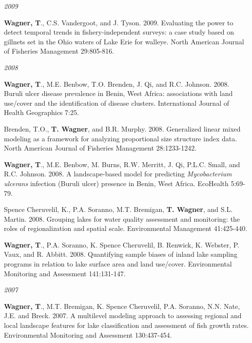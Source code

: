\documentclass[10pt]{article}
\begin{document}
\begin{flushleft}
\begin{etaremune}[start=18]
\end{etaremune}
\emph{2009}
\begin{etaremune}[start=15]
\item {\bf Wagner, T}., C.S. Vandergoot, and J. Tyson. 2009. Evaluating the power to detect temporal trends in fishery-independent surveys: a case study based on gillnets set in the Ohio waters of Lake Erie for walleye. North American Journal of Fisheries Management 29:805-816.

\end{etaremune}
\emph{2008}
\begin{etaremune}[start=14]
\item {\bf Wagner, T}., M.E. Benbow, T.O. Brenden, J. Qi, and R.C. Johnson. 2008. Buruli ulcer disease prevalence in Benin, West Africa: associations with land use/cover and the identification of disease clusters. International Journal of Health Geographics 7:25.

\item Brenden, T.O., {\bf T. Wagner}, and B.R. Murphy. 2008. Generalized linear mixed modeling as a framework for analyzing proportional size structure index data. North American Journal of Fisheries Management 28:1233-1242.

\item {\bf Wagner, T}., M.E. Benbow, M. Burns, R.W. Merritt, J. Qi, P.L.C. Small, and R.C. Johnson. 2008. A landscape-based model for predicting \emph{Mycobacterium ulcerans} infection (Buruli ulcer) presence in Benin, West Africa. EcoHealth 5:69-79.

\item Spence Cheruvelil, K., P.A. Soranno, M.T. Bremigan, {\bf T. Wagner}, and S.L. Martin. 2008. Grouping lakes for water quality assessment and monitoring: the roles of regionalization and spatial scale. Environmental Management 41:425-440. 

\item {\bf Wagner, T}., P.A. Soranno, K. Spence Cheruvelil, B. Renwick, K. Webster, P. Vaux, and R. Abbitt. 2008. Quantifying sample biases of inland lake sampling programs in relation to lake surface area and land use/cover. Environmental Monitoring and Assessment 141:131-147.

\end{etaremune}
\emph{2007}
\begin{etaremune}[start=9]
\item {\bf Wagner, T}., M.T. Bremigan, K. Spence Cheruvelil, P.A. Soranno, N.N. Nate, J.E. and Breck. 2007. A multilevel modeling approach to assessing regional and local landscape features for lake classification and assessment of fish growth rates. Environmental Monitoring and Assessment 130:437-454.


\end{etaremune}
\end{flushleft}
\end{document}
